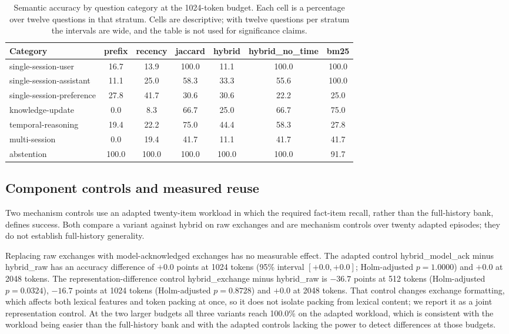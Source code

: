 \begin{table}[htbp]
\centering
\small
\caption{Semantic accuracy by question category at the 1024-token budget. Each cell is a
percentage over twelve questions in that stratum. Cells are descriptive; with twelve
questions per stratum the intervals are wide, and the table is not used for significance
claims.}
\label{tab:categories}
\begin{tabular}{lcccccc}
\toprule
Category & prefix & recency & jaccard & hybrid & hybrid\_no\_time & bm25 \\
\midrule
single-session-user        & 16.7 & 13.9 & 100.0 & 11.1 & 100.0 & 100.0 \\
single-session-assistant   & 11.1 & 25.0 & 58.3  & 33.3 & 55.6  & 100.0 \\
single-session-preference  & 27.8 & 41.7 & 30.6  & 30.6 & 22.2  & 25.0 \\
knowledge-update           & 0.0  & 8.3  & 66.7  & 25.0 & 66.7  & 75.0 \\
temporal-reasoning         & 19.4 & 22.2 & 75.0  & 44.4 & 58.3  & 27.8 \\
multi-session              & 0.0  & 19.4 & 41.7  & 11.1 & 41.7  & 41.7 \\
abstention                 & 100.0 & 100.0 & 100.0 & 100.0 & 100.0 & 91.7 \\
\bottomrule
\end{tabular}
\end{table}

\FloatBarrier

\subsection{Component controls and measured reuse}

\label{sec:ctrl_controls}

Two mechanism controls use an adapted twenty-item workload in which the required
fact-item recall, rather than the full-history bank, defines success. Both compare a
variant against hybrid on raw exchanges and are mechanism controls over twenty
adapted episodes; they do not establish full-history generality.

Replacing raw exchanges with model-acknowledged exchanges has no measurable effect.
The adapted control hybrid\_model\_ack minus hybrid\_raw has an accuracy difference
of $+0.0$ points at 1024 tokens (95\% interval $[+0.0,+0.0]$; Holm-adjusted
$p=1.0000$) and $+0.0$ at 2048 tokens. The representation-difference control
hybrid\_exchange minus hybrid\_raw is $-36.7$ points at 512 tokens (Holm-adjusted
$p=0.0324$), $-16.7$ points at 1024 tokens (Holm-adjusted $p=0.8728$) and $+0.0$ at
2048 tokens. That control changes exchange formatting, which affects both lexical
features and token packing at once, so it does not isolate packing from lexical
content; we report it as a joint representation control. At the two larger budgets
all three variants reach 100.0\% on the adapted workload, which is consistent with the
workload being easier than the full-history bank and with the adapted controls
lacking the power to detect differences at those budgets.

